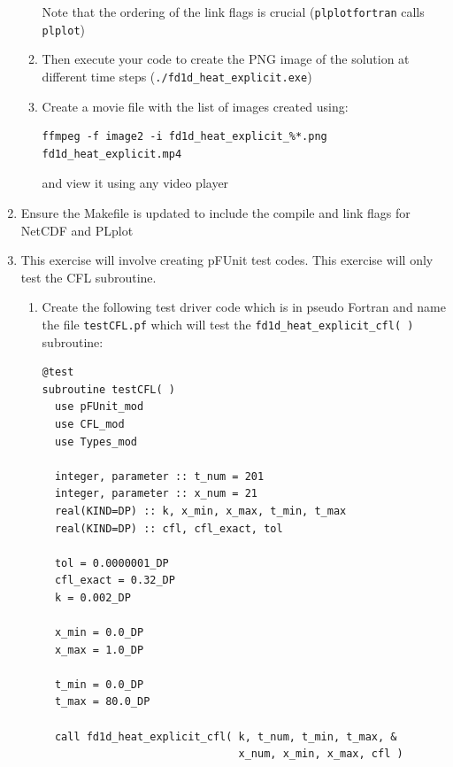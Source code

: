 \documentclass[12pt]{article}
\begin{document}
\begin{enumerate}
\begin{enumerate}
Note that the ordering of the link flags is crucial (\texttt{plplotfortran} calls \texttt{plplot})
\item Then execute your code to create the PNG image of the solution at different time steps
  (\texttt{./fd1d\_heat\_explicit.exe})
\item Create a movie file with the list of images created using:
\begin{verbatim}
ffmpeg -f image2 -i fd1d_heat_explicit_%*.png fd1d_heat_explicit.mp4
\end{verbatim}
and view it using any video player
\end{enumerate}
\item Ensure the Makefile is updated to include the compile and link flags for NetCDF and PLplot
\item This exercise will involve creating pFUnit test codes. This exercise will only
test the CFL subroutine. 
\begin{enumerate}
\item Create the following test driver code which is in pseudo Fortran and name the file \texttt{testCFL.pf} 
which will test the \texttt{fd1d\_heat\_explicit\_cfl( )} subroutine:
\begin{verbatim}
@test
subroutine testCFL( )
  use pFUnit_mod
  use CFL_mod
  use Types_mod

  integer, parameter :: t_num = 201
  integer, parameter :: x_num = 21
  real(KIND=DP) :: k, x_min, x_max, t_min, t_max 
  real(KIND=DP) :: cfl, cfl_exact, tol

  tol = 0.0000001_DP
  cfl_exact = 0.32_DP
  k = 0.002_DP

  x_min = 0.0_DP
  x_max = 1.0_DP

  t_min = 0.0_DP
  t_max = 80.0_DP
  
  call fd1d_heat_explicit_cfl( k, t_num, t_min, t_max, &
                               x_num, x_min, x_max, cfl )


\end{verbatim}
\end{enumerate}
\end{enumerate}
\end{document}
